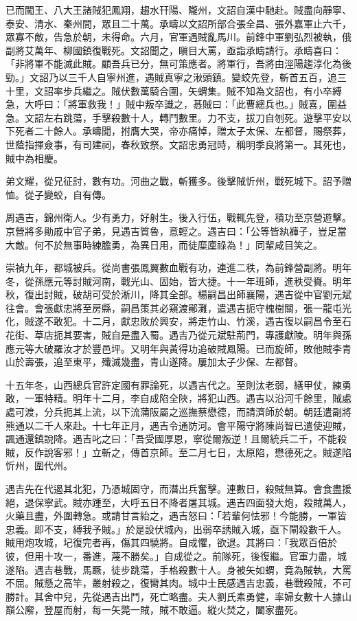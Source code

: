 \begin{pinyinscope}
已而闖王、八大王諸賊犯鳳翔，趨水幵陽、隴州，文詔自漢中馳赴。賊盡向靜寧、泰安、清水、秦州間，眾且二十萬。承疇以文詔所部合張全昌、張外嘉軍止六千，眾寡不敵，告急於朝，未得命。六月，官軍遇賊亂馬川。前鋒中軍劉弘烈被執，俄副將艾萬年、柳國鎮復戰死。文詔聞之，瞋目大罵，亟詣承疇請行。承疇喜曰：「非將軍不能滅此賊。顧吾兵已分，無可策應者。將軍行，吾將由涇陽趨淳化為後勁。」文詔乃以三千人自寧州進，遇賊真寧之湫頭鎮。變蛟先登，斬首五百，追三十里，文詔率步兵繼之。賊伏數萬騎合圍，矢蝟集。賊不知為文詔也，有小卒縛急，大呼曰：「將軍救我！」賊中叛卒識之，惎賊曰：「此曹總兵也。」賊喜，圍益急。文詔左右跳蕩，手擊殺數十人，轉鬥數里。力不支，拔刀自刎死。遊擊平安以下死者二十餘人。承疇聞，拊膺大哭，帝亦痛悼，贈太子太保、左都督，賜祭葬，世蔭指揮僉事，有司建祠，春秋致祭。文詔忠勇冠時，稱明季良將第一。其死也，賊中為相慶。

弟文耀，從兄征討，數有功。河曲之戰，斬獲多。後擊賊忻州，戰死城下。詔予贈恤。從子變蛟，自有傳。

周遇吉，錦州衛人。少有勇力，好射生。後入行伍，戰輒先登，積功至京營遊擊。京營將多勛戚中官子弟，見遇吉質魯，意輕之。遇吉曰：「公等皆紈褲子，豈足當大敵。何不於無事時練膽勇，為異日用，而徒糜廩祿為！」同輩咸目笑之。

崇禎九年，都城被兵。從尚書張鳳翼數血戰有功，連進二秩，為前鋒營副將。明年冬，從孫應元等討賊河南，戰光山、固始，皆大捷。十一年班師，進秩受賚。明年秋，復出討賊，破胡可受於淅川，降其全部。楊嗣昌出師襄陽，遇吉從中官劉元斌往會。會張獻忠將至房縣，嗣昌策其必窺渡鄖灘，遣遇吉扼守槐樹關，張一龍屯光化，賊遂不敢犯。十二月，獻忠敗於興安，將走竹山、竹溪，遇吉復以嗣昌令至石花街、草店扼其要害，賊自是盡入蜀。遇吉乃從元斌駐荊門，專護獻陵。明年與孫應元等大破羅汝才於豐邑坪。又明年與黃得功追破賊鳳陽。已而旋師，敗他賊李青山於壽張，追至東平，殲滅幾盡，青山遂降。屢加太子少保、左都督。

十五年冬，山西總兵官許定國有罪論死，以遇吉代之。至則汰老弱，繕甲仗，練勇敢，一軍特精。明年十二月，李自成陷全陜，將犯山西。遇吉以沿河千餘里，賊處處可渡，分兵扼其上流，以下流蒲阪屬之巡撫蔡懋德，而請濟師於朝。朝廷遣副將熊通以二千人來赴。十七年正月，遇吉令通防河。會平陽守將陳尚智已遣使迎賊，諷通還鎮說降。遇吉叱之曰：「吾受國厚恩，寧從爾叛逆！且爾統兵二千，不能殺賊，反作說客邪！」立斬之，傳首京師。至二月七日，太原陷，懋德死之。賊遂陷忻州，圍代州。

遇吉先在代遏其北犯，乃憑城固守，而潛出兵奮擊。連數日，殺賊無算。會食盡援絕，退保寧武。賊亦踵至，大呼五日不降者屠其城。遇吉四面發大炮，殺賊萬人，火藥且盡，外圍轉急。或請甘言紿之，遇吉怒曰：「若輩何怯邪！今能勝，一軍皆忠義。即不支，縛我予賊。」於是設伏城內，出弱卒誘賊入城，亟下閘殺數千人。賊用炮攻城，圮復完者再，傷其四驍將。自成懼，欲退。其將曰：「我眾百倍於彼，但用十攻一，番進，蔑不勝矣。」自成從之。前隊死，後復繼。官軍力盡，城遂陷。遇吉巷戰，馬蹶，徒步跳蕩，手格殺數十人。身被矢如蝟，竟為賊執，大罵不屈。賊懸之高竿，叢射殺之，復臠其肉。城中士民感遇吉忠義，巷戰殺賊，不可勝計。其舍中兒，先從遇吉出鬥，死亡略盡。夫人劉氏素勇健，率婦女數十人據山巔公廨，登屋而射，每一矢斃一賊，賊不敢逼。縱火焚之，闔家盡死。


\end{pinyinscope}
